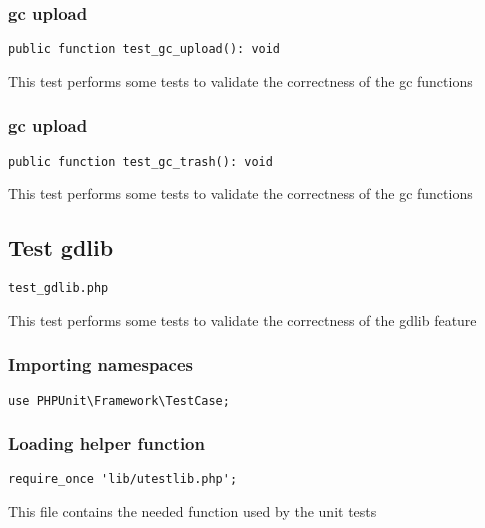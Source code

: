 \documentclass[a4paper]{article}
\begin{document}
\hypertarget{toc186}{}
\subsubsection{gc upload}

\begin{lstlisting}
public function test_gc_upload(): void
\end{lstlisting}

This test performs some tests to validate the correctness
of the gc functions

\hypertarget{toc187}{}
\subsubsection{gc upload}

\begin{lstlisting}
public function test_gc_trash(): void
\end{lstlisting}

This test performs some tests to validate the correctness
of the gc functions

\hypertarget{toc188}{}
\subsection{Test gdlib}

\begin{lstlisting}
test_gdlib.php
\end{lstlisting}

This test performs some tests to validate the correctness
of the gdlib feature

\hypertarget{toc189}{}
\subsubsection{Importing namespaces}

\begin{lstlisting}
use PHPUnit\Framework\TestCase;
\end{lstlisting}

\hypertarget{toc190}{}
\subsubsection{Loading helper function}

\begin{lstlisting}
require_once 'lib/utestlib.php';
\end{lstlisting}

This file contains the needed function used by the unit tests
\end{document}
